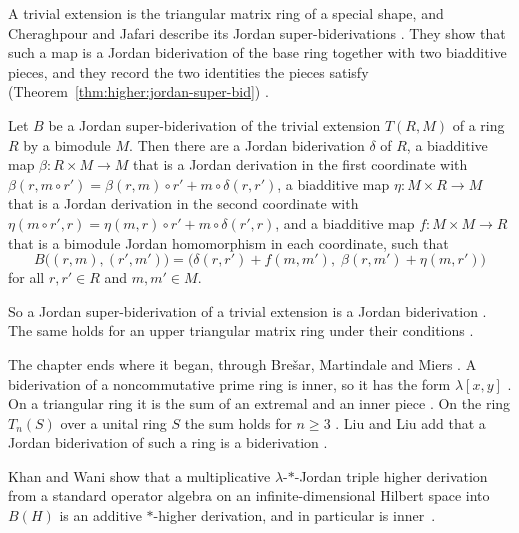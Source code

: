 A trivial extension is the triangular matrix ring of a special shape, and
Cheraghpour and Jafari describe its Jordan super-biderivations
\cite[p.~1]{CheraghpourJafari2024}. They show that such a map is a Jordan
biderivation of the base ring together with two biadditive pieces, and they record
the two identities the pieces satisfy (Theorem~\ref{thm:higher:jordan-super-bid})
\cite[Theorem~2.6, p.~9]{CheraghpourJafari2024}.\begin{theorem}\label{thm:higher:jordan-super-bid}
Let $B$ be a Jordan super-biderivation of the trivial extension $T(R,M)$ of a ring
$R$ by a bimodule $M$. Then there are a Jordan biderivation $\delta$ of $R$, a
biadditive map $\beta\colon R\times M\to M$ that is a Jordan derivation in the
first coordinate with
$\beta(r,m\circ r')=\beta(r,m)\circ r'+m\circ\delta(r,r')$, a biadditive map
$\eta\colon M\times R\to M$ that is a Jordan derivation in the second coordinate
with $\eta(m\circ r',r)=\eta(m,r)\circ r'+m\circ\delta(r',r)$, and a biadditive map
$f\colon M\times M\to R$ that is a bimodule Jordan homomorphism in each coordinate,
such that
\[
B\bigl((r,m),(r',m')\bigr)=\bigl(\delta(r,r')+f(m,m'),\;\beta(r,m')+\eta(m,r')\bigr)
\]
for all $r,r'\in R$ and $m,m'\in M$.
\end{theorem}

So a Jordan super-biderivation of a trivial extension is a Jordan biderivation
\cite[p.~1]{CheraghpourJafari2024}. The same holds for an upper triangular matrix
ring under their conditions \cite[p.~1]{CheraghpourJafari2024}.

The chapter ends where it began, through Brešar, Martindale and Miers
\cite[p.~1952]{Wang2016Bideriv}. A biderivation of a noncommutative prime
ring is inner, so it has the form $\lambda[x,y]$
\cite[p.~1952]{Wang2016Bideriv}. On a triangular ring it is the sum of an
extremal and an inner piece \cite[p.~1956]{Wang2016Bideriv}. On the ring
$T_n(S)$ over a unital ring $S$ the sum holds for $n\geq 3$
\cite[p.~1956]{Wang2016Bideriv}. Liu and Liu add that a Jordan
biderivation of such a ring is a biderivation
\cite[p.~1417]{Liu2021JordanBid}.

Khan and Wani show that a multiplicative $\lambda$-$*$-Jordan triple higher derivation from a standard operator algebra on an infinite-dimensional Hilbert space into $B(H)$ is an additive $*$-higher derivation, and in particular is inner~\cite{WlMultiplicativeLambdaJordanTrip2021}.
